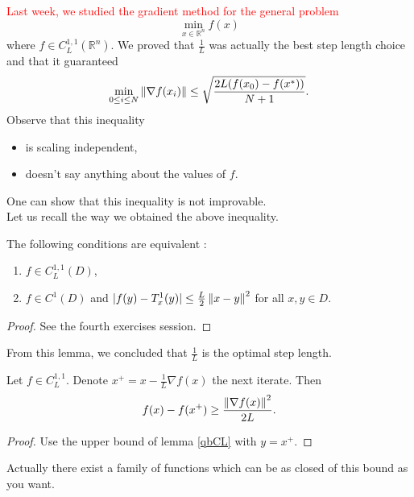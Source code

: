 \textcolor{red}{Last week, we studied the gradient method for the general problem}
\begin{equation*}
\min_{x \in \mathbb{R}^n} f(x)
\end{equation*}
where $f \in C_L^{1,1}(\mathbb{R}^n)$. We proved that $\frac{1}{L}$ was actually the best step length choice and that it guaranteed
\begin{equation}
\min_{0 \le i \le N} \left\Vert \nabla f(x_i) \right\Vert \le \sqrt{\frac{2L(f(x_0)-f(x^*))}{N+1}} .
\label{MinGrad}
\end{equation}
Observe that this inequality
\begin{itemize}
\item is scaling independent,
\item doesn't say anything about the values of $f$.
\end{itemize}
One can show that this inequality is not improvable. \\

Let us recall the way we obtained the above inequality.

\begin{lemma}
The following conditions are equivalent :
\begin{enumerate}%
\item $f \in C_L^{1,1}(D)$,
\item $f \in C^1(D)$ and $|f(y) - T_x^1(y)| \le \frac{L}{2}\left\Vert x-y \right\Vert^2$ for all $x,y \in D$.
\end{enumerate}
\label{qbCL}
\end{lemma}
\begin{proof}
See the fourth exercises session.
\end{proof}

From this lemma, we concluded that $\frac{1}{L}$ is the optimal step length.

\begin{theorem}
Let $f \in C_L^{1,1}$. Denote $x^+ = x - \frac{1}{L}\nabla f(x)$ the next iterate. Then
\begin{equation*}
f(x) - f(x^+) \ge \frac{{\left\Vert \nabla f(x) \right\Vert}^2}{2L} .
\end{equation*}
\label{DecreaseGuar}
\end{theorem}
\begin{proof}
Use the upper bound of lemma \ref{qbCL} with $y = x^+$.
\end{proof}
\noindent Actually there exist a family of functions which can be as closed of this bound as you want. \\


